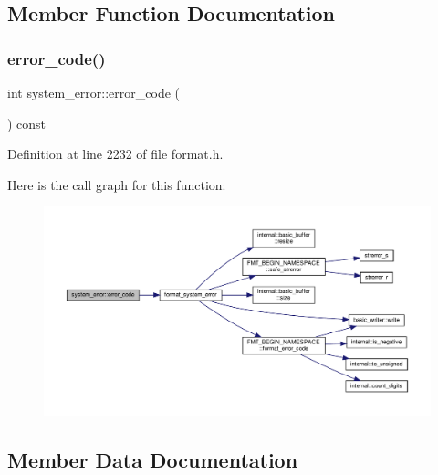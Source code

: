 \subsection{Member Function Documentation}
\mbox{\label{classsystem__error_a9c095f54f80c8393f6bf24eb9d188ec4}} 
\subsubsection{\texorpdfstring{error\+\_\+code()}{error\_code()}}
{\footnotesize\ttfamily int system\+\_\+error\+::error\+\_\+code (\begin{DoxyParamCaption}{ }\end{DoxyParamCaption}) const\hspace{0.3cm}{\ttfamily [inline]}}



Definition at line 2232 of file format.\+h.

Here is the call graph for this function\+:
\nopagebreak
\begin{figure}[H]
\begin{center}
\leavevmode
\includegraphics[width=350pt]{classsystem__error_a9c095f54f80c8393f6bf24eb9d188ec4_cgraph}
\end{center}
\end{figure}


\subsection{Member Data Documentation}
\mbox{\label{classsystem__error_a35ed90a7a994961cdb27b5a004b0e9de}} 
